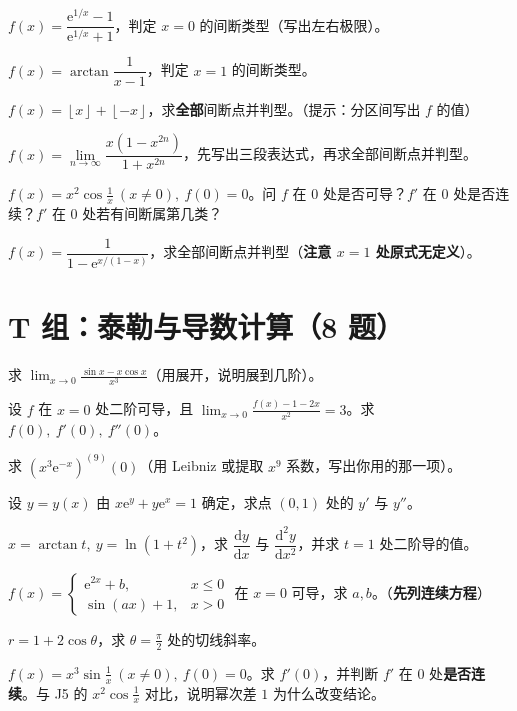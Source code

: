 \documentclass[11pt,a4paper]{ctexart}
\newcommand{\ee}{\mathrm{e}}
\newcommand{\D}{\mathrm{d}}
\newcommand{\floor}[1]{\left\lfloor #1\right\rfloor}
\begin{document}
\begin{qlist}
\item $f(x)=\dfrac{\ee^{1/x}-1}{\ee^{1/x}+1}$，判定 $x=0$ 的间断类型（写出左右极限）。
\item $f(x)=\arctan\dfrac1{x-1}$，判定 $x=1$ 的间断类型。
\item $f(x)=\floor{x}+\floor{-x}$，求\textbf{全部}间断点并判型。（提示：分区间写出 $f$ 的值）
\item $f(x)=\lim\limits_{n\to\infty}\dfrac{x\left(1-x^{2n}\right)}{1+x^{2n}}$，先写出三段表达式，再求全部间断点并判型。
\item $f(x)=x^2\cos\frac1x\ (x\ne0),\ f(0)=0$。问 $f$ 在 $0$ 处是否可导？$f'$ 在 $0$ 处是否连续？$f'$ 在 $0$ 处若有间断属第几类？
\item $f(x)=\dfrac1{1-\ee^{x/(1-x)}}$，求全部间断点并判型（\textbf{注意 $x=1$ 处原式无定义}）。
\end{qlist}

\section{T 组：泰勒与导数计算（8 题）}

\begin{qlist}
\item 求 $\displaystyle\lim_{x\to0}\frac{\sin x-x\cos x}{x^3}$（用展开，说明展到几阶）。
\item 设 $f$ 在 $x=0$ 处二阶可导，且 $\displaystyle\lim_{x\to0}\frac{f(x)-1-2x}{x^2}=3$。求 $f(0),\ f'(0),\ f''(0)$。
\item 求 $\left(x^3\ee^{-x}\right)^{(9)}(0)$（用 Leibniz 或提取 $x^9$ 系数，写出你用的那一项）。
\item 设 $y=y(x)$ 由 $x\ee^{y}+y\ee^{x}=1$ 确定，求点 $(0,1)$ 处的 $y'$ 与 $y''$。
\item $x=\arctan t,\ y=\ln(1+t^2)$，求 $\dfrac{\D y}{\D x}$ 与 $\dfrac{\D^2y}{\D x^2}$，并求 $t=1$ 处二阶导的值。
\item $f(x)=\begin{cases}\ee^{2x}+b,&x\leq0\\ \sin(ax)+1,&x>0\end{cases}$ 在 $x=0$ 可导，求 $a,b$。（\textbf{先列连续方程}）
\item $r=1+2\cos\theta$，求 $\theta=\frac\pi2$ 处的切线斜率。
\item $f(x)=x^3\sin\frac1x\ (x\ne0),\ f(0)=0$。求 $f'(0)$，并判断 $f'$ 在 $0$ 处\textbf{是否连续}。与 J5 的 $x^2\cos\frac1x$ 对比，说明幂次差 $1$ 为什么改变结论。
\end{qlist}
\end{document}
